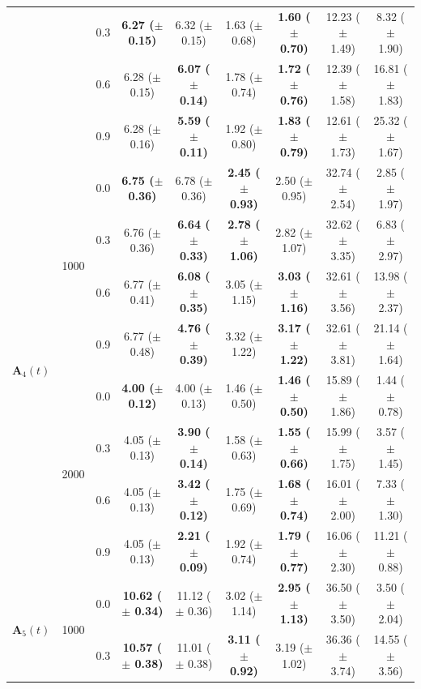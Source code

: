 \begin{table}[htbp]
{\begin{tabular}{lll|cc|cc|cc}
 &  & 0.3 & \textbf{6.27 ($\pm$ 0.15)} & 6.32 ($\pm$ 0.15) & 1.63 ($\pm$ 0.68) & \textbf{1.60 ($\pm$ 0.70)} & 12.23 ($\pm$ 1.49) & 8.32 ($\pm$ 1.90) \\
 &  & 0.6 & 6.28 ($\pm$ 0.15) & \textbf{6.07 ($\pm$ 0.14)} & 1.78 ($\pm$ 0.74) & \textbf{1.72 ($\pm$ 0.76)} & 12.39 ($\pm$ 1.58) & 16.81 ($\pm$ 1.83) \\
 &  & 0.9 & 6.28 ($\pm$ 0.16) & \textbf{5.59 ($\pm$ 0.11)} & 1.92 ($\pm$ 0.80) & \textbf{1.83 ($\pm$ 0.79)} & 12.61 ($\pm$ 1.73) & 25.32 ($\pm$ 1.67) \\
\hline
\multirow{8}{*}{$\mathbf{A}_4(t)$} & \multirow{4}{*}{1000} & 0.0 & \textbf{6.75 ($\pm$ 0.36)} & 6.78 ($\pm$ 0.36) & \textbf{2.45 ($\pm$ 0.93)} & 2.50 ($\pm$ 0.95) & 32.74 ($\pm$ 2.54) & 2.85 ($\pm$ 1.97) \\
 &  & 0.3 & 6.76 ($\pm$ 0.36) & \textbf{6.64 ($\pm$ 0.33)} & \textbf{2.78 ($\pm$ 1.06)} & 2.82 ($\pm$ 1.07) & 32.62 ($\pm$ 3.35) & 6.83 ($\pm$ 2.97) \\
 &  & 0.6 & 6.77 ($\pm$ 0.41) & \textbf{6.08 ($\pm$ 0.35)} & 3.05 ($\pm$ 1.15) & \textbf{3.03 ($\pm$ 1.16)} & 32.61 ($\pm$ 3.56) & 13.98 ($\pm$ 2.37) \\
 &  & 0.9 & 6.77 ($\pm$ 0.48) & \textbf{4.76 ($\pm$ 0.39)} & 3.32 ($\pm$ 1.22) & \textbf{3.17 ($\pm$ 1.22)} & 32.61 ($\pm$ 3.81) & 21.14 ($\pm$ 1.64) \\
\cline{2-9}
 & \multirow{4}{*}{2000} & 0.0 & \textbf{4.00 ($\pm$ 0.12)} & 4.00 ($\pm$ 0.13) & 1.46 ($\pm$ 0.50) & \textbf{1.46 ($\pm$ 0.50)} & 15.89 ($\pm$ 1.86) & 1.44 ($\pm$ 0.78) \\
 &  & 0.3 & 4.05 ($\pm$ 0.13) & \textbf{3.90 ($\pm$ 0.14)} & 1.58 ($\pm$ 0.63) & \textbf{1.55 ($\pm$ 0.66)} & 15.99 ($\pm$ 1.75) & 3.57 ($\pm$ 1.45) \\
 &  & 0.6 & 4.05 ($\pm$ 0.13) & \textbf{3.42 ($\pm$ 0.12)} & 1.75 ($\pm$ 0.69) & \textbf{1.68 ($\pm$ 0.74)} & 16.01 ($\pm$ 2.00) & 7.33 ($\pm$ 1.30) \\
 &  & 0.9 & 4.05 ($\pm$ 0.13) & \textbf{2.21 ($\pm$ 0.09)} & 1.92 ($\pm$ 0.74) & \textbf{1.79 ($\pm$ 0.77)} & 16.06 ($\pm$ 2.30) & 11.21 ($\pm$ 0.88) \\
\hline
\multirow{8}{*}{$\mathbf{A}_5(t)$} & \multirow{4}{*}{1000} & 0.0 & \textbf{10.62 ($\pm$ 0.34)} & 11.12 ($\pm$ 0.36) & 3.02 ($\pm$ 1.14) & \textbf{2.95 ($\pm$ 1.13)} & 36.50 ($\pm$ 3.50) & 3.50 ($\pm$ 2.04) \\
 &  & 0.3 & \textbf{10.57 ($\pm$ 0.38)} & 11.01 ($\pm$ 0.38) & \textbf{3.11 ($\pm$ 0.92)} & 3.19 ($\pm$ 1.02) & 36.36 ($\pm$ 3.74) & 14.55 ($\pm$ 3.56) \\

\end{tabular}}
\end{table}
